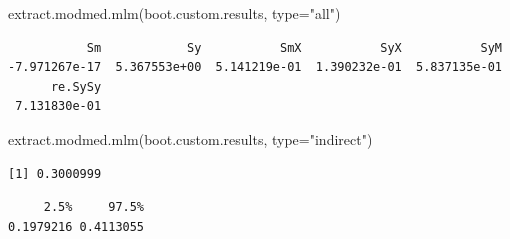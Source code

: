 \documentclass[
  letterpaper,
  DIV=11,
  numbers=noendperiod]{scrreprt}
\newenvironment{Shaded}{\begin{snugshade}}{\end{snugshade}}
\newcommand{\AttributeTok}[1]{\textcolor[rgb]{0.40,0.45,0.13}{#1}}
\newcommand{\CommentTok}[1]{\textcolor[rgb]{0.37,0.37,0.37}{#1}}
\newcommand{\ConstantTok}[1]{\textcolor[rgb]{0.56,0.35,0.01}{#1}}
\newcommand{\FloatTok}[1]{\textcolor[rgb]{0.68,0.00,0.00}{#1}}
\newcommand{\FunctionTok}[1]{\textcolor[rgb]{0.28,0.35,0.67}{#1}}
\newcommand{\NormalTok}[1]{\textcolor[rgb]{0.00,0.23,0.31}{#1}}
\newcommand{\OtherTok}[1]{\textcolor[rgb]{0.00,0.23,0.31}{#1}}
\newcommand{\SpecialCharTok}[1]{\textcolor[rgb]{0.37,0.37,0.37}{#1}}
\newcommand{\StringTok}[1]{\textcolor[rgb]{0.13,0.47,0.30}{#1}}
\begin{document}
\begin{Shaded}
\begin{Highlighting}[]
\FunctionTok{extract.modmed.mlm}\NormalTok{(boot.custom.results, }\AttributeTok{type=}\StringTok{"all"}\NormalTok{)}
\end{Highlighting}
\end{Shaded}

\begin{verbatim}
           Sm            Sy           SmX           SyX           SyM 
-7.971267e-17  5.367553e+00  5.141219e-01  1.390232e-01  5.837135e-01 
      re.SySy 
 7.131830e-01 
\end{verbatim}

\begin{Shaded}
\begin{Highlighting}[]
\FunctionTok{extract.modmed.mlm}\NormalTok{(boot.custom.results, }\AttributeTok{type=}\StringTok{"indirect"}\NormalTok{)}
\end{Highlighting}
\end{Shaded}

\begin{verbatim}
[1] 0.3000999
\end{verbatim}

\begin{Shaded}
\end{Shaded}

\begin{verbatim}
     2.5%     97.5% 
0.1979216 0.4113055 
\end{verbatim}
\end{document}
